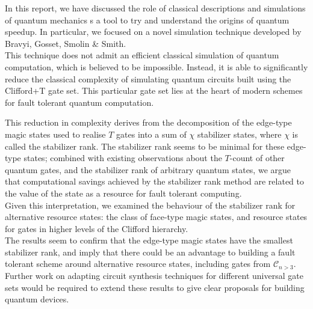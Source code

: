 \documentclass{standalone}
\begin{document}
In this report, we have discussed the role of classical descriptions and simulations of quantum mechanics s a tool to try and understand the origins of quantum speedup. In particular, we focused on a novel simulation technique developed by Bravyi, Gosset, Smolin \& Smith. \\
This technique does not admit an efficient classical simulation of quantum computation, which is believed to be impossible. Instead, it is able to significantly reduce the classical complexity of simulating quantum circuits built using the Clifford+T gate set. This particular gate set lies at the heart of modern schemes for fault tolerant quantum computation.
\par
This reduction in complexity derives from the decomposition of the edge-type magic states used to realise $T$ gates into a sum of $\chi$ stabilizer states, where $\chi$ is called the stabilizer rank. The stabilizer rank seems to be minimal for these edge-type states; combined with existing observations about the $T$-count of other quantum gates, and the stabilizer rank of arbitrary quantum states, we argue that computational savings achieved by the stabilizer rank method are related to the value of the state as a resource for fault tolerant computing.\\
Given this interpretation, we examined the behaviour of the stabilizer rank for alternative resource states: the class of face-type magic states, and resource states for gates in higher levels of the Clifford hierarchy. \\
The results seem to confirm that the edge-type magic states have the smallest stabilizer rank, and imply that there could be an advantage to building a fault tolerant scheme around alternative resource states, including gates from $\mathcal{C}_{n>3}$. Further work on adapting circuit synthesis techniques for different universal gate sets would be required to extend these results to give clear proposals for building quantum devices. 
\end{document}
